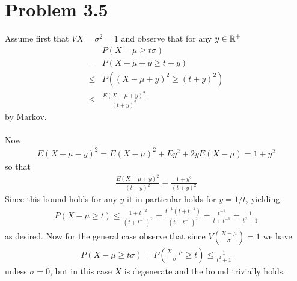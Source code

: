 \section*{Problem 3.5}
Assume first that $VX=\sigma^2=1$ and observe that for any $y \in \mathbb{R}^+$
\begin{align*}
	& P(X-\mu \geq t \sigma) \\
	=& P(X-\mu+y \geq t+y) \\
	\leq& P\left( \left( X-\mu+y \right)^2 \geq \left( t+y \right)^2 \right) \\
	\leq & \frac{E\left( X-\mu+y \right)^2}{\left( t+y \right)^2}
\end{align*}
by Markov. \\ \\
Now
\begin{align*}
	E\left( X-\mu-y \right)^2=E\left( X-\mu \right)^2+Ey^2+2yE\left( X-\mu \right)=1+y^2
\end{align*}
so that
\begin{align*}
	\frac{E\left( X-\mu+y \right)^2}{\left( t+y \right)^2}=\frac{1+y^2}{\left( t+y \right)^2}
\end{align*}
Since this bound holds for any $y$ it in particular holds for $y=1/t$, yielding 
\begin{align*}
	P(X-\mu \geq t) \leq \frac{1+t^{-2}}{\left( t+t^{-1} \right)^2}
	=\frac{t^{-1}\left( t+t^{-1} \right)}{\left( t+t^{-1} \right)^2}=\frac{t^{-1}}{t+t^{-1}}=\frac{1}{t^2+1}
\end{align*}
as desired.
Now for the general case observe that 
since $V(\frac{X-\mu}{\sigma})=1$ we have
\begin{align*}
	P\left( X-\mu \geq t \sigma \right)=P\left( \frac{X-\mu}{\sigma} \geq t \right) \leq \frac{1}{t^2+1}
\end{align*}
unless $\sigma=0$, but in this case $X$ is degenerate and the bound trivially holds.
